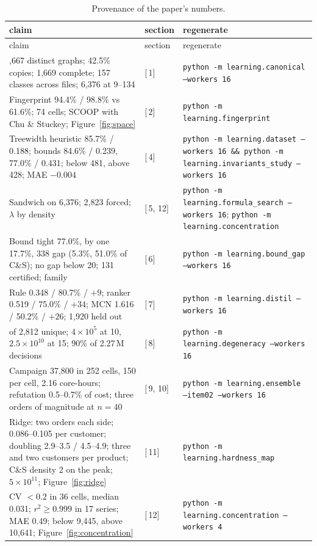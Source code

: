 \documentclass[11pt,a4paper]{article}
\renewcommand{\S}[1]{[\textsection\,#1]}
\newcommand{\code}[1]{\texttt{#1}}
\begin{document}
\footnotesize
\begin{longtable}{>{\raggedright\arraybackslash}p{}l>{\raggedright\arraybackslash}p{}}
\caption{Provenance of the paper's numbers.}\\
\toprule
claim & section & regenerate \\
\midrule
\endfirsthead
\toprule
claim & section & regenerate \\
\midrule
\endhead
\bottomrule
\endfoot
3,667 distinct graphs; 42.5\% copies; 1,669 complete; 157 classes across files; 6,376 at 9--134 & \S{1} & \code{python -m learning.canonical --workers 16} \\
Fingerprint 94.4\% / 98.8\% vs 61.6\%; 74 cells; SCOOP with Chu \& Stuckey; Figure~\ref{fig:space} & \S{2} & \code{python -m learning.fingerprint} \\
Treewidth heuristic 85.7\% / 0.188; bounds 84.6\% / 0.239, 77.0\% / 0.431; below 481, above 428; MAE $-0.004$ & \S{4} & \code{python -m learning.dataset --workers 16 \&\& python -m learning.invariants\_study --workers 16} \\
Sandwich on 6,376; 2,823 forced; $\lambda$ by density & \S{5, 12} & \code{python -m learning.formula\_search --workers 16}; \code{python -m learning.concentration} \\
Bound tight 77.0\%, by one 17.7\%, 338 gap (5.3\%, 51.0\% of C\&S); no gap below 20; 131 certified; family & \S{6} & \code{python -m learning.bound\_gap --workers 16} \\
Rule 0.348 / 80.7\% / $+9$; ranker 0.519 / 75.0\% / $+34$; MCN 1.616 / 50.2\% / $+26$; 1,920 held out & \S{7} & \code{python -m learning.distil --workers 16} \\
0 of 2,812 unique; $4 \times 10^5$ at 10, $2.5 \times 10^{10}$ at 15; 90\% of 2.27\,M decisions & \S{8} & \code{python -m learning.degeneracy --workers 16} \\
Campaign 37,800 in 252 cells, 150 per cell, 2.16 core-hours; refutation 0.5--0.7\% of cost; three orders of magnitude at $n=40$ & \S{9, 10} & \code{python -m learning.ensemble --item02 --workers 16} \\
Ridge: two orders each side; 0.086--0.105 per customer; doubling 2.9--3.5 / 4.5--4.9; three and two customers per product; C\&S density 2 on the peak; $5 \times 10^{11}$; Figure~\ref{fig:ridge} & \S{11} & \code{python -m learning.hardness\_map} \\
CV $< 0.2$ in 36 cells, median 0.031; $r^2 \ge 0.999$ in 17 series; MAE 0.49; below 9,445, above 10,641; Figure~\ref{fig:concentration} & \S{12} & \code{python -m learning.concentration --workers 4} \\

\end{longtable}
\end{document}
